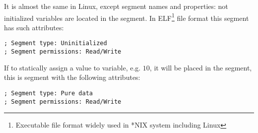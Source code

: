 {It is almost the same in Linux, except segment names and properties: 
not initialized variables are located in the  segment. 
In ELF\footnote{Executable file format widely used in *NIX system including Linux} 
file format this segment has such attributes:}

\begin{lstlisting}
; Segment type: Uninitialized
; Segment permissions: Read/Write
\end{lstlisting}

{If to statically assign a value to variable, e.g. $10$, it will be placed in the  segment, 
this is segment with the following attributes:}

\begin{lstlisting}
; Segment type: Pure data
; Segment permissions: Read/Write
\end{lstlisting}



